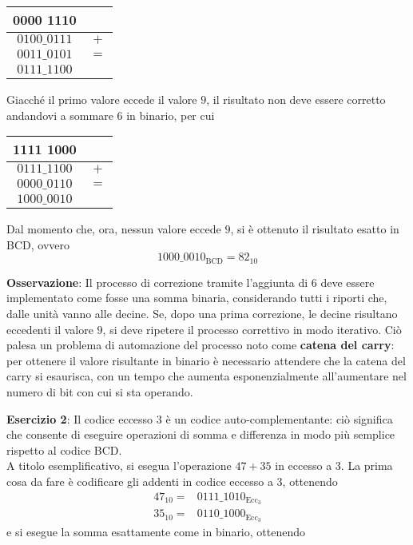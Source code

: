 \documentclass[a4paper]{extarticle}
\renewcommand\arraystretch{}
\begin{document}
\noindent
\begin{table}[H]
\setlength{\tabcolsep}{4pt}
\renewcommand{\arraystretch}{1.2}
\centering
\begin{tabular}{cc}
    0000 1110 & \\
    \hline
    $0100\_0111$ & $+$\\
    \hline
    $0011\_0101$ & $=$\\
    \hline
    $0111\_1100$ & \\
\end{tabular}
\end{table}

\noindent
Giacché il primo valore eccede il valore $9$, il risultato non deve essere corretto andandovi a sommare $6$ in binario, per cui

\noindent
\begin{table}[H]
\setlength{\tabcolsep}{4pt}
\renewcommand{\arraystretch}{1.2}
\centering
\begin{tabular}{cc}
    1111 1000 & \\
    \hline
    $0111\_1100$ & $+$\\
    \hline
    $0000\_0110$ & $=$\\
    \hline
    $1000\_0010$ & \\
\end{tabular}
\end{table}

\noindent
Dal momento che, ora, nessun valore eccede $9$, si è ottenuto il risultato esatto in BCD, ovvero
\[1000\_0010_\text{BCD} = 82_{10}\]

\vspace{1em}
\noindent
\textbf{Osservazione}: Il processo di correzione tramite l'aggiunta di $6$ deve essere implementato come fosse una somma binaria, considerando tutti i riporti che, dalle unità vanno alle decine. Se, dopo una prima correzione, le decine risultano eccedenti il valore $9$, si deve ripetere il processo correttivo in modo iterativo. Ciò palesa un problema di automazione del processo noto come \textbf{catena del carry}: per ottenere il valore risultante in binario è necessario attendere che la catena del carry si esaurisca, con un tempo che aumenta esponenzialmente all'aumentare nel numero di bit con cui si sta operando.

\vspace{1em}
\noindent
\textbf{Esercizio 2}: Il codice eccesso $3$ è un codice auto-complementante: ciò significa che consente di eseguire operazioni di somma e differenza in modo più semplice rispetto al codice BCD.\\
A titolo esemplificativo, si esegua l'operazione $47+35$ in eccesso a $3$. La prima cosa da fare è codificare gli addenti in codice eccesso a $3$, ottenendo
\begin{align*}
    47_{10} = & 0111\_1010_{\text{Ecc}_3}\\
    35_{10} = & 0110\_1000_{\text{Ecc}_3}
\end{align*}
e si esegue la somma esattamente come in binario, ottenendo
\end{document}
